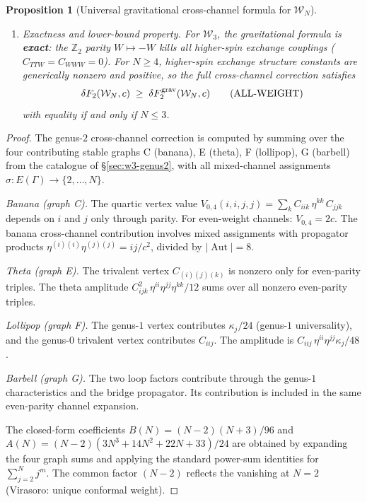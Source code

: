 \documentclass[11pt]{article}
\newtheorem{proposition}[theorem]{Proposition}
\theoremstyle{definition}
\theoremstyle{remark}
\newcommand{\Walg}{\mathcal{W}}
\newcommand{\grav}{\mathrm{grav}}
\DeclareMathOperator{\Aut}{Aut}
\numberwithin{equation}{section}
\begin{document}
\begin{proposition}[Universal gravitational cross-channel formula for
$\Walg_N$]
\begin{enumerate}[label=\textup{(\roman*)}]
\item \emph{Exactness and lower-bound property.}
 For $\Walg_3$, the gravitational formula is \textbf{exact}:
 the $\mathbb{Z}_2$ parity $W \mapsto -W$ kills all
 higher-spin exchange couplings ($C_{TTW} = C_{WWW} = 0$).
 For $N \geq 4$, higher-spin exchange structure constants
 are generically nonzero and positive, so
 the full cross-channel correction satisfies
 \begin{equation}\label{eq:lower-bound}
 \delta F_2(\Walg_N, c)
 \;\geq\;
 \delta F_2^{\grav}(\Walg_N, c)
 \qquad\text{\textup{(}ALL-WEIGHT\textup{)}}
 \end{equation}
 with equality if and only if $N \leq 3$.
\end{enumerate}
\end{proposition}

\begin{proof}
The genus-$2$ cross-channel correction is computed by
summing over the four contributing stable graphs
C (banana), E (theta), F (lollipop), G (barbell) from the catalogue
of \S\ref{sec:w3-genus2},
with all mixed-channel assignments
$\sigma \colon E(\Gamma) \to \{2, \ldots, N\}$.

\emph{Banana (graph C).}
The quartic vertex value
$V_{0,4}(i,i,j,j) = \sum_k C_{iik}\,\eta^{kk}\,C_{jjk}$
depends on $i$ and $j$ only through parity.
For even-weight channels: $V_{0,4} = 2c$.
The banana cross-channel contribution involves mixed
assignments with propagator products
$\eta^{(i)(i)}\eta^{(j)(j)} = ij/c^2$, divided by
$|\Aut| = 8$.

\emph{Theta (graph E).}
The trivalent vertex $C_{(i)(j)(k)}$ is nonzero only for
even-parity triples.
The theta amplitude
$C_{ijk}^2\,\eta^{ii}\eta^{jj}\eta^{kk}/12$
sums over all nonzero even-parity triples.

\emph{Lollipop (graph F).}
The genus-$1$ vertex contributes $\kappa_j/24$
(genus-$1$ universality), and the genus-$0$ trivalent
vertex contributes $C_{iij}$.
The amplitude is
$C_{iij}\,\eta^{ii}\eta^{jj}\kappa_j/48$.

\emph{Barbell (graph G).}
The two loop factors contribute through the genus-$1$
characteristics and the bridge propagator. Its contribution is
included in the same even-parity channel expansion.

The closed-form coefficients
$B(N) = (N{-}2)(N{+}3)/96$ and
$A(N) = (N{-}2)(3N^3 + 14N^2 + 22N + 33)/24$
are obtained by expanding the four graph sums and applying the
standard power-sum identities for \(\sum_{j=2}^N j^m\).
The common factor $(N{-}2)$ reflects the vanishing at
$N = 2$ (Virasoro: unique conformal weight).


\end{proof}
\end{document}
